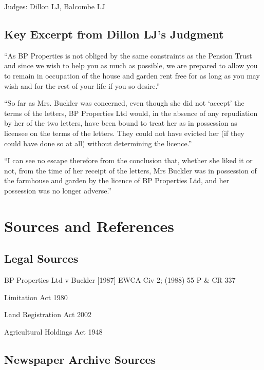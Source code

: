 \documentclass[11pt,a4paper]{article}
\begin{document}
Judges: Dillon LJ, Balcombe LJ

\subsection{Key Excerpt from Dillon LJ's Judgment}

``As BP Properties is not obliged by the same constraints as the Pension Trust and since we wish to help you as much as possible, we are prepared to allow you to remain in occupation of the house and garden rent free for as long as you may wish and for the rest of your life if you so desire.''

``So far as Mrs. Buckler was concerned, even though she did not `accept' the terms of the letters, BP Properties Ltd would, in the absence of any repudiation by her of the two letters, have been bound to treat her as in possession as licensee on the terms of the letters. They could not have evicted her (if they could have done so at all) without determining the licence.''

``I can see no escape therefore from the conclusion that, whether she liked it or not, from the time of her receipt of the letters, Mrs Buckler was in possession of the farmhouse and garden by the licence of BP Properties Ltd, and her possession was no longer adverse.''

\section{Sources and References}

\subsection{Legal Sources}

\begin{enumerate}[label={[\arabic*]}]
    \item BP Properties Ltd v Buckler [1987] EWCA Civ 2; (1988) 55 P \& CR 337
    \item Limitation Act 1980
    \item Land Registration Act 2002
    \item Agricultural Holdings Act 1948
\end{enumerate}

\subsection{Newspaper Archive Sources}
\end{document}
